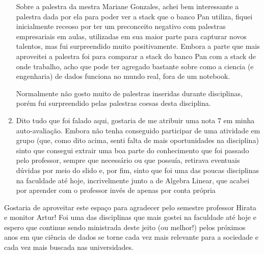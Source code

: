 \documentclass{article}
\begin{document}
\begin{enumerate}
Sobre a palestra da mestra Mariane Gonzales, achei bem interessante a palestra dada por ela para poder ver a stack que o banco Pan utiliza, fiquei inicialmente receoso por ter um preconceito negativo com palestras empresariais em aulas, utilizadas em sua maior parte para capturar novos talentos, mas fui surpreendido muito positivamente. Embora a parte que mais aproveitei a palestra foi para comparar a stack do banco Pan com a stack de onde trabalho, acho que pode ter agregado bastante sobre como a ciencia (e engenharia) de dados funciona no mundo real, fora de um notebook.

Normalmente não gosto muito de palestras inseridas durante disciplinas, porém fui surpreendido pelas palestras coesas desta disciplina.
\item Dito tudo que foi falado aqui, gostaria de me atribuir uma nota 7 em minha auto-avaliação. Embora não tenha conseguido participar de uma atividade em grupo (que, como dito acima, senti falta de mais oportunidades na disciplina) sinto que consegui extrair uma boa parte do conhecimento que foi passado pelo professor, sempre que necessário ou que possuía, retirava eventuais dúvidas por meio do slido e, por fim, sinto que foi uma das poucas disciplinas na faculdade até hoje, incrivelmente junto a de Algebra Linear, que acabei por aprender com o professor invés de apenas por conta própria

\end{enumerate}

Gostaria de aproveitar este espaço para agradecer pelo semestre professor Hirata e monitor Artur! Foi uma das disciplinas que mais gostei na faculdade até hoje e espero que continue sendo ministrada deste jeito (ou melhor!) pelos próximos anos em que ciência de dados se torne cada vez mais relevante para a sociedade e cada vez mais buscada nas universidades.
\end{document}
